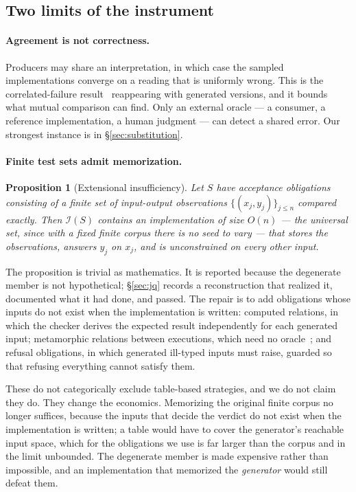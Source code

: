 \documentclass[10pt,twocolumn]{article}
\newtheorem{proposition}{Proposition}
\begin{document}
\subsection{Two limits of the instrument}

\paragraph{Agreement is not correctness.} Producers may share an
interpretation, in which case the sampled implementations converge on a
reading that is uniformly wrong. This is the correlated-failure
result~\cite{knight1986} reappearing with generated versions, and it
bounds what mutual comparison can find. Only an external
oracle --- a consumer, a reference implementation, a human
judgment --- can detect a shared error. Our strongest instance is in
\S\ref{sec:substitution}.

\paragraph{Finite test sets admit memorization.}

\begin{proposition}[Extensional insufficiency]
\label{prop:ext}
Let $S$ have acceptance obligations consisting of a finite set of
input-output observations $\{(x_j,y_j)\}_{j \le n}$ compared exactly.
Then $\mathcal{I}(S)$ contains an implementation of size $O(n)$ --- the
universal set, since with a fixed finite corpus there is no seed to vary
--- that
stores the observations, answers $y_j$ on $x_j$, and is unconstrained on
every other input.
\end{proposition}

The proposition is trivial as mathematics. It is reported because the
degenerate member is not hypothetical; \S\ref{sec:jq} records a
reconstruction that realized it, documented what it had done, and passed.
The repair is to add obligations whose inputs do not exist when the
implementation is written: computed relations, in which the checker
derives the expected result independently for each generated input;
metamorphic relations between executions, which need no
oracle~\cite{chen1998}; and refusal obligations, in which generated
ill-typed inputs must raise, guarded so that refusing everything cannot
satisfy them.

These do not categorically exclude table-based strategies, and we do not
claim they do. They change the economics. Memorizing the original finite
corpus no longer suffices, because the inputs that decide the verdict do
not exist when the implementation is written; a table would have to
cover the generator's reachable input space, which for the obligations
we use is far larger than the corpus and in the limit unbounded. The
degenerate member is made expensive rather than impossible, and an
implementation that memorized the \emph{generator} would still defeat
them.
\end{document}
